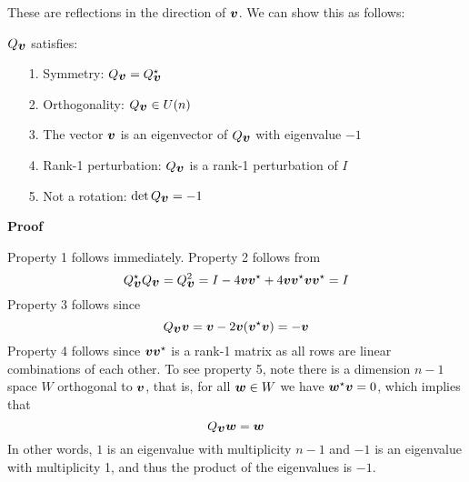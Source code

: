 These are reflections in the direction of $\bm{{\mbox{\boldmath$v$\unboldmath}}}$. We can show this as follows:

\begin{proposition} $Q_{\bm{{\mbox{\boldmath$v$\unboldmath}}}}$ satisfies:

\begin{itemize}
\item[1. ] Symmetry: $Q_{\bm{{\mbox{\boldmath$v$\unboldmath}}}} = Q_{\bm{{\mbox{\boldmath$v$\unboldmath}}}}^\star$


\item[2. ] Orthogonality: $Q_{\bm{{\mbox{\boldmath$v$\unboldmath}}}} \in U(n)$


\item[3. ] The vector $\bm{{\mbox{\boldmath$v$\unboldmath}}}$ is an eigenvector of $Q_{\bm{{\mbox{\boldmath$v$\unboldmath}}}}$ with eigenvalue $-1$


\item[4. ] Rank-1 perturbation: $Q_{\bm{{\mbox{\boldmath$v$\unboldmath}}}}$ is a rank-1 perturbation of $I$


\item[5. ] Not a rotation: $\det Q_{\bm{{\mbox{\boldmath$v$\unboldmath}}}} = -1$

\end{itemize}
\end{proposition}
\textbf{Proof}

Property 1 follows immediately. Property 2 follows from
\[
Q_{\bm{{\mbox{\boldmath$v$\unboldmath}}}}^\star Q_{\bm{{\mbox{\boldmath$v$\unboldmath}}}} = Q_{\bm{{\mbox{\boldmath$v$\unboldmath}}}}^2 = I - 4 \bm{{\mbox{\boldmath$v$\unboldmath}}} \bm{{\mbox{\boldmath$v$\unboldmath}}}^\star + 4 \bm{{\mbox{\boldmath$v$\unboldmath}}} \bm{{\mbox{\boldmath$v$\unboldmath}}}^\star \bm{{\mbox{\boldmath$v$\unboldmath}}} \bm{{\mbox{\boldmath$v$\unboldmath}}}^\star = I
\]
Property 3 follows since
\[
Q_{\bm{{\mbox{\boldmath$v$\unboldmath}}}} \bm{{\mbox{\boldmath$v$\unboldmath}}} = \bm{{\mbox{\boldmath$v$\unboldmath}}} - 2\bm{{\mbox{\boldmath$v$\unboldmath}}} (\bm{{\mbox{\boldmath$v$\unboldmath}}}^\star\bm{{\mbox{\boldmath$v$\unboldmath}}}) = -\bm{{\mbox{\boldmath$v$\unboldmath}}}
\]
Property 4 follows since $\bm{{\mbox{\boldmath$v$\unboldmath}}} \bm{{\mbox{\boldmath$v$\unboldmath}}}^\star$ is a rank-1 matrix as all rows are linear combinations of each other. To see property 5, note there is a dimension $n-1$ space $W$ orthogonal to $\bm{{\mbox{\boldmath$v$\unboldmath}}}$, that is, for all $\bm{{\mbox{\boldmath$w$\unboldmath}}} \in W$ we have $\bm{{\mbox{\boldmath$w$\unboldmath}}}^\star \bm{{\mbox{\boldmath$v$\unboldmath}}} = 0$, which implies that
\[
Q_{\bm{{\mbox{\boldmath$v$\unboldmath}}}} \bm{{\mbox{\boldmath$w$\unboldmath}}} = \bm{{\mbox{\boldmath$w$\unboldmath}}}
\]
In other words, $1$ is an eigenvalue with multiplicity $n-1$ and $-1$ is an eigenvalue with multiplicity 1, and thus the product of the eigenvalues is $-1$.

